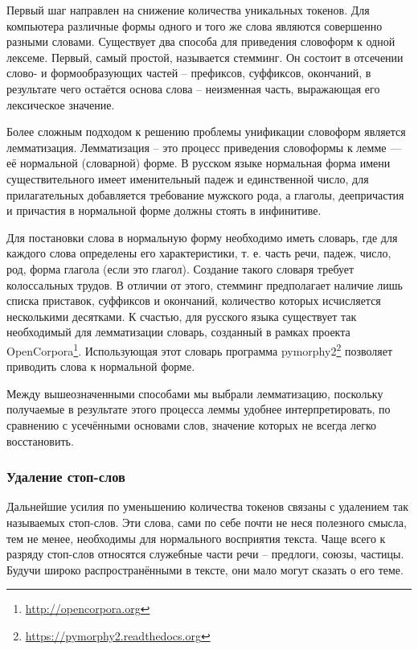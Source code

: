 Первый шаг направлен на снижение количества уникальных токенов. Для компьютера различные формы одного и того же слова являются совершенно разными словами. Существует два способа для приведения словоформ к одной лексеме. Первый, самый простой, называется стемминг. Он состоит в отсечении слово- и формообразующих частей -- префиксов, суффиксов, окончаний, в результате чего остаётся основа слова -- неизменная часть, выражающая его лексическое значение.

Более сложным подходом к решению проблемы унификации словоформ является лемматизация. Лемматизация -- это процесс приведения словоформы к лемме — её нормальной (словарной) форме. В русском языке нормальная форма имени существительного имеет именительный падеж и единственной число, для прилагательных добавляется требование мужского рода, а глаголы, деепричастия и причастия в нормальной форме должны стоять в инфинитиве.

Для постановки слова в нормальную форму необходимо иметь словарь, где для каждого слова определены его характеристики, т. е. часть речи, падеж, число, род, форма глагола (если это глагол). Создание такого словаря требует колоссальных трудов. В отличии от этого, стемминг предполагает наличие лишь списка приставок, суффиксов и окончаний, количество которых исчисляется несколькими десятками. К счастью, для русского языка существует так необходимый для лемматизации словарь, созданный в рамках проекта OpenCorpora\footnote{\href{http://opencorpora.org}{http://opencorpora.org}}. Использующая этот словарь программа pymorphy2\footnote{\href{https://pymorphy2.readthedocs.org}{https://pymorphy2.readthedocs.org}} позволяет приводить слова к нормальной форме.

Между вышеозначенными способами мы выбрали лемматизацию, поскольку получаемые в результате этого процесса леммы удобнее интерпретировать, по сравнению с усечёнными основами слов, значение которых не всегда легко восстановить.

\subsubsection{Удаление стоп-слов}
Дальнейшие усилия по уменьшению количества токенов связаны с удалением так называемых стоп-слов. Эти слова, сами по себе почти не неся полезного смысла, тем не менее, необходимы для нормального восприятия текста. Чаще всего к разряду стоп-слов относятся служебные части речи -- предлоги, союзы, частицы. Будучи широко распространёнными в тексте, они мало могут сказать о его теме.

